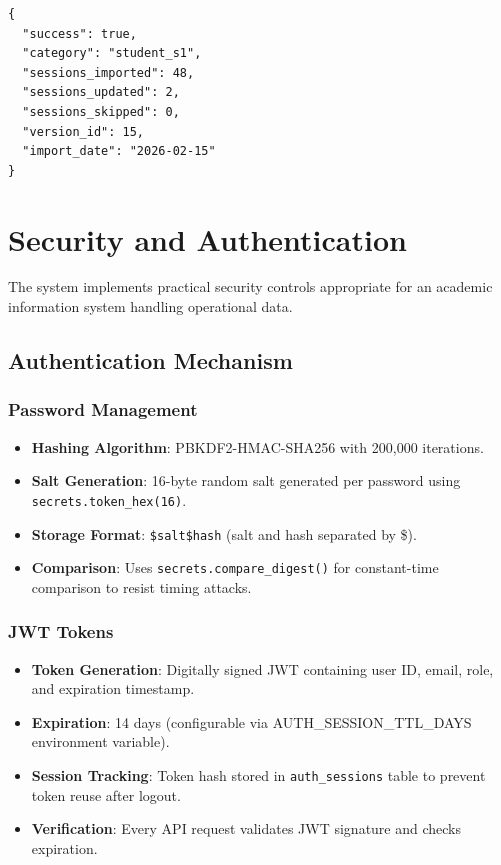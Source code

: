 \begin{fig}[H]
\begin{verbatim}
{
  "success": true,
  "category": "student_s1",
  "sessions_imported": 48,
  "sessions_updated": 2,
  "sessions_skipped": 0,
  "version_id": 15,
  "import_date": "2026-02-15"
}
\end{verbatim}

\section{Security and Authentication}

The system implements practical security controls appropriate for an academic information system handling operational data.

\subsection{Authentication Mechanism}

\subsubsection{Password Management}
\begin{itemize}
    \item \textbf{Hashing Algorithm}: PBKDF2-HMAC-SHA256 with 200,000 iterations.
    \item \textbf{Salt Generation}: 16-byte random salt generated per password using \texttt{secrets.token\_hex(16)}.
    \item \textbf{Storage Format}: \texttt{\$salt\$hash} (salt and hash separated by \$).
    \item \textbf{Comparison}: Uses \texttt{secrets.compare\_digest()} for constant-time comparison to resist timing attacks.
\end{itemize}

\subsubsection{JWT Tokens}
\begin{itemize}
    \item \textbf{Token Generation}: Digitally signed JWT containing user ID, email, role, and expiration timestamp.
    \item \textbf{Expiration}: 14 days (configurable via AUTH\_SESSION\_TTL\_DAYS environment variable).
    \item \textbf{Session Tracking}: Token hash stored in \texttt{auth\_sessions} table to prevent token reuse after logout.
    \item \textbf{Verification}: Every API request validates JWT signature and checks expiration.
\end{itemize}


\end{fig}
